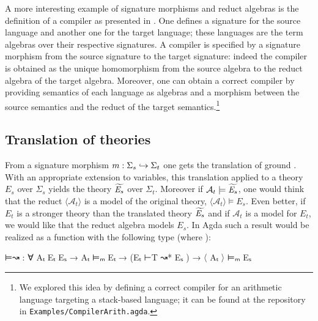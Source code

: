 A more interesting example of signature morphisms and reduct algebras
is the definition of a compiler as presented in
\cite{thatcher1981more}. One defines a signature for the source
language and another one for the target language; these languages are
the term algebras over their respective signatures. A compiler is
specified by a signature morphism from the source signature to the
target signature: indeed the compiler is obtained as the unique
homomorphism from the source algebra to the reduct algebra of the
target algebra. Moreover, one can obtain a correct compiler by
providing semantics of each language as algebras and a morphism
between the source semantics and the reduct of the target
semantics.\footnote{We explored this idea by defining a correct
  compiler for an arithmetic language targeting a stack-based
  language; it can be found at the repository in
  \nolinkurl{Examples/CompilerArith.agda}.}


\newcommand{\theory}[1]{\ensuremath{\mathit{E}_{#1}}}

\subsection{Translation of theories} From a signature morphism
$m : \Sigma_s \hookrightarrow \Sigma_t$ one gets the translation of ground
. With
an appropriate extension to variables, this translation applied to a
theory $\theory{s}$ over $\Sigma_s$ yields the theory $\intTheo{s}$
over $\Sigma_t$. Moreover if $\mathcal{A}_t\models\intTheo{s}$, one
would think that the reduct $\langle \mathcal{A}_t \rangle$ is a model
of the original theory, \ie
$\langle \mathcal{A}_t \rangle \models \theory{s}$. Even better, if
$\theory{t}$ is a stronger theory than the translated theory
$\intTheo{s}$ and if $\mathcal{A}_t$ is a model for $\theory{t}$, we
would like that the reduct algebra models $\theory{s}$. In Agda such a
result would be realized as a function  with the following type
(where ):
\begin{spec}
 ⊨↝ : ∀ Aₜ Eₜ Eₛ → Aₜ ⊨ₘ Eₜ → (Eₜ ⊢T ↝* Eₛ ) → 〈 Aₜ 〉 ⊨ₘ Eₛ
\end{spec}

